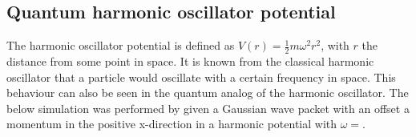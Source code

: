 \subsection*{Quantum harmonic oscillator potential}
The harmonic oscillator potential is defined as $V(r) = \frac{1}{2}m\omega^2r^2$, with $r$ the distance from some point in space. It is known from the classical harmonic oscillator that a particle would oscillate with a certain frequency in space. This behaviour can also be seen in the quantum analog of the harmonic oscillator. The below simulation was performed by given a Gaussian wave packet with an offset a momentum in the positive x-direction in a harmonic potential with $\omega = $.
\def\arraystretch{0.6}%
\setlength\tabcolsep{0.5mm}
